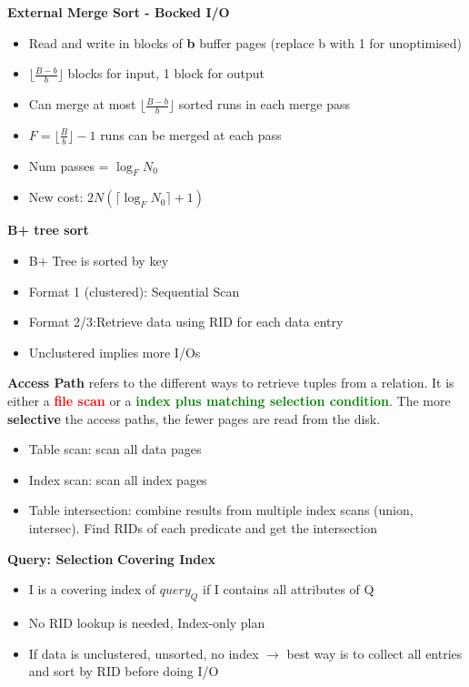 \documentclass[10pt, landscape]{article}
\newcommand{\floor}[1]{\lfloor #1 \rfloor}
\newcommand{\ceil}[1]{\lceil #1 \rceil}
\begin{document}
\begin{multicols}{4}
\textbf{External Merge Sort - Bocked I/O}
\begin{itemize}
  \item Read and write in blocks of \textbf{b} buffer pages (replace b with 1 for unoptimised)
  \item $\floor{\frac{B-b}{b}}$ blocks for input, 1 block for output
  \item Can merge at most $\floor{\frac{B-b}{b}}$ sorted runs in each merge pass
  \item $F=\floor{\frac{B}{b}} - 1$ runs can be merged at each pass
  \item Num passes = $\log_{F} N_0$
  \item New cost: $2N(\ceil{\log_{F} N_0} + 1)$
\end{itemize}

\textbf{B+ tree sort}
\begin{itemize}
  \item B+ Tree is sorted by key
  \item Format 1 (clustered): Sequential Scan 
  \item Format 2/3:Retrieve data using RID for each data entry 
  \item Unclustered implies more I/Os
\end{itemize}

\textbf{Access Path} refers to the different ways to retrieve tuples from a relation. It is either a \textbf{\textcolor{red}{file scan}} or a \textbf{\textcolor{green}{index plus matching selection condition}}. The more \textbf{selective} the access paths, the fewer pages are read from the disk.
\begin{itemize}
  \item Table scan: scan all data pages 
  \item Index scan: scan all index pages 
  \item Table intersection: combine results from multiple index scans (union, intersec). Find RIDs of each predicate and get the intersection
\end{itemize}

\textbf{Query: Selection}
\textbf{Covering Index}
\begin{itemize}
  \item I is a covering index of $query_Q$ if I contains all attributes of Q
  \item No RID lookup is needed, Index-only plan
  \item If data is unclustered, unsorted, no index $\rightarrow$ best way is to collect all entries and sort by RID before doing I/O 
\end{itemize}


\end{multicols}
\end{document}
